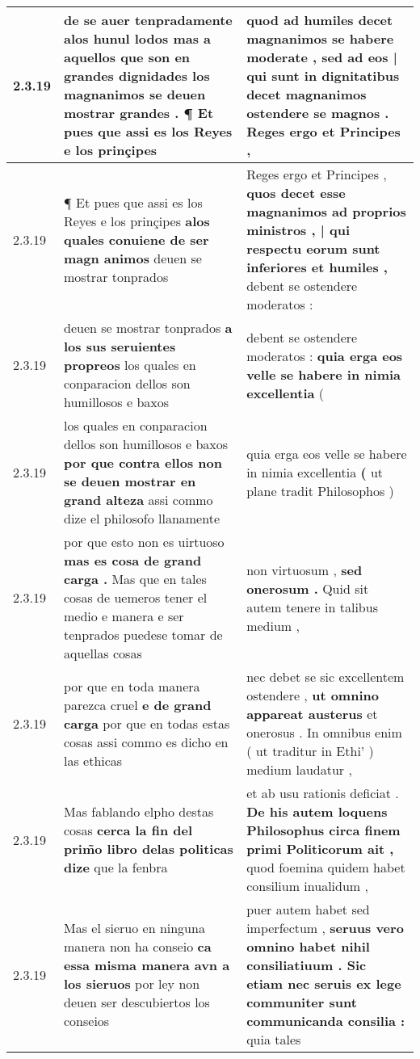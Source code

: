 \begin{tabular}{|p{1cm}|p{6.5cm}|p{6.5cm}|}
2.3.19 & de se auer tenpradamente alos hunul lodos \textbf{ mas a aquellos que son en grandes dignidades los magnanimos se deuen mostrar grandes . } ¶ Et pues que assi es los Reyes e los prinçipes & quod ad humiles decet magnanimos se habere moderate , \textbf{ sed ad eos | qui sunt in dignitatibus decet magnanimos ostendere se magnos . } Reges ergo et Principes , \\\hline
2.3.19 & ¶ Et pues que assi es los Reyes e los prinçipes \textbf{ alos quales conuiene de ser magn animos } deuen se mostrar tonprados & Reges ergo et Principes , \textbf{ quos decet esse magnanimos ad proprios ministros , | qui respectu eorum sunt inferiores et humiles , } debent se ostendere moderatos : \\\hline
2.3.19 & deuen se mostrar tonprados \textbf{ a los sus seruientes propreos } los quales en conparacion dellos son humillosos e baxos & debent se ostendere moderatos : \textbf{ quia erga eos velle se habere in nimia excellentia } ( \\\hline
2.3.19 & los quales en conparacion dellos son humillosos e baxos \textbf{ por que contra ellos non se deuen mostrar en grand alteza } assi commo dize el philosofo llanamente & quia erga eos velle se habere in nimia excellentia \textbf{ ( } ut plane tradit Philosophos ) \\\hline
2.3.19 & por que esto non es uirtuoso \textbf{ mas es cosa de grand carga . } Mas que en tales cosas de uemeros tener el medio e manera e ser tenprados puedese tomar de aquellas cosas & non virtuosum , \textbf{ sed onerosum . } Quid sit autem tenere in talibus medium , \\\hline
2.3.19 & por que en toda manera parezca cruel \textbf{ e de grand carga } por que en todas estas cosas assi commo es dicho en las ethicas & nec debet se sic excellentem ostendere , \textbf{ ut omnino appareat austerus } et onerosus . In omnibus enim ( ut traditur in Ethi’ ) medium laudatur , \\\hline
2.3.19 & Mas fablando elpho destas cosas \textbf{ cerca la fin del prim̃o libro delas politicas dize } que la fenbra & et ab usu rationis deficiat . \textbf{ De his autem loquens Philosophus circa finem primi Politicorum ait , } quod foemina quidem habet consilium inualidum , \\\hline
2.3.19 & Mas el sieruo en ninguna manera non ha conseio \textbf{ ca essa misma manera avn a los sieruos } por ley non deuen ser descubiertos los conseios & puer autem habet sed imperfectum , \textbf{ seruus vero omnino habet nihil consiliatiuum . Sic etiam nec seruis ex lege communiter sunt communicanda consilia : } quia tales \\\hline

\end{tabular}
